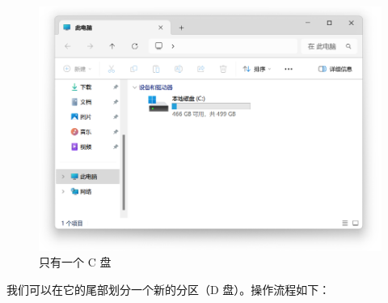 \begin{figure}[htb!]
  \centering
  \includegraphics[width=.75\textwidth]{assets/appendix/One_partition.png}
  \caption{只有一个 C 盘}
  \label{fig:One_partition}
\end{figure}

我们可以在它的尾部划分一个新的分区（D 盘）。操作流程如下：

